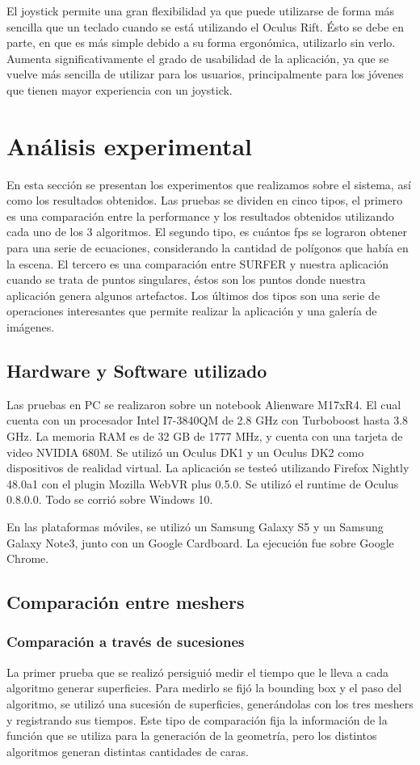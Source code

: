 \documentclass[12pt]{article}
\begin{document}
El joystick permite una gran flexibilidad ya que puede utilizarse de forma más sencilla que un teclado cuando se está utilizando el Oculus Rift. Ésto se debe en parte, en que es más simple debido a su forma ergonómica, utilizarlo sin verlo. Aumenta significativamente el grado de usabilidad de la aplicación, ya que se vuelve más sencilla de utilizar para los usuarios, principalmente para los jóvenes que tienen mayor experiencia con un joystick.
\clearpage
\section{Análisis experimental}
\noindent En esta sección se presentan los experimentos que realizamos sobre el sistema, así como los resultados obtenidos. Las pruebas se dividen en cinco tipos, el primero es una comparación entre la performance y los resultados obtenidos utilizando cada uno de los 3 algoritmos. El segundo tipo, es cuántos fps se lograron obtener para una serie de ecuaciones, considerando la cantidad de polígonos que había en la escena. El tercero es una comparación entre SURFER y nuestra aplicación cuando se trata de puntos singulares, éstos son los puntos donde nuestra aplicación genera algunos artefactos. Los últimos dos tipos son una serie de operaciones interesantes que permite realizar la aplicación y una galería de imágenes.
\subsection{Hardware y Software utilizado}
\noindent Las pruebas en PC se realizaron sobre un notebook Alienware M17xR4. El cual cuenta con un procesador Intel I7-3840QM de 2.8 GHz con Turboboost hasta 3.8 GHz. La memoria RAM es de 32 GB de 1777 MHz, y cuenta con una tarjeta de video NVIDIA 680M. Se utilizó un Oculus DK1 y un Oculus DK2 como dispositivos de realidad virtual. La aplicación se testeó utilizando Firefox Nightly 48.0a1 con el plugin Mozilla WebVR plus 0.5.0. Se utilizó el runtime de Oculus 0.8.0.0. Todo se corrió sobre Windows 10.

En las plataformas móviles, se utilizó un Samsung  Galaxy S5 y un Samsung  Galaxy Note3, junto con un Google Cardboard. La ejecución fue sobre Google Chrome.

\subsection{Comparación entre meshers}
\subsubsection{Comparación a través de sucesiones}
\noindent La primer prueba que se realizó persiguió medir el tiempo que le lleva a cada algoritmo generar superficies. Para medirlo se fijó la bounding box y el paso del algoritmo, se utilizó una sucesión de superficies, generándolas con los tres meshers y registrando sus tiempos. Este tipo de comparación fija la información de la función que se utiliza para la generación de la geometría, pero los distintos algoritmos generan distintas cantidades de caras.
\end{document}
